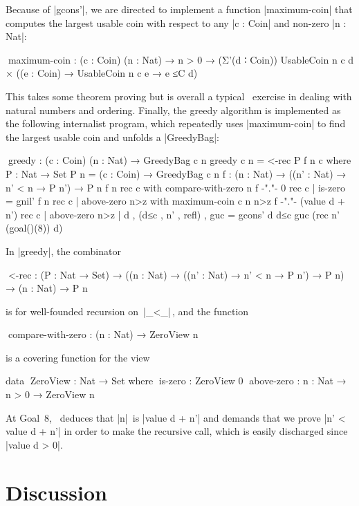 Because of |gcons'|, we are directed to implement a function |maximum-coin| that computes the largest usable coin with respect to any |c : Coin| and non-zero |n : Nat|:
\begin{code}
^^^maximum-coin :
  (c : Coin) (n : Nat) → n > 0 →
  (Σ'(d ∶ Coin))  UsableCoin n c d × ((e : Coin) → UsableCoin n c e → e ≤C d)
\end{code}
This takes some theorem proving but is overall a typical \Agda\ exercise in dealing with natural numbers and ordering.
Finally, the greedy algorithm is implemented as the following internalist program, which repeatedly uses |maximum-coin| to find the largest usable coin and unfolds a |GreedyBag|:
\begin{code}
^^^greedy : (c : Coin) (n : Nat) → GreedyBag c n
greedy c n = <-rec P f n c
  where
    P : Nat → Set
    P n = (c : Coin) → GreedyBag c n
    f : (n : Nat) → ((n' : Nat) → n' < n → P n') → P n
    f          n               rec  c  with compare-with-zero n 
    f {-"."-}  0               rec  c  | is-zero = gnil'
    f          n               rec  c  | above-zero n>z   with maximum-coin c n n>z
    f {-"."-}  (value d + n')  rec  c  | above-zero n>z   |  d , (d≤c , n' , refl) , guc =
                                                             gcons' d d≤c guc (rec n' (goal()(8)) d)
\end{code}
In |greedy|, the combinator
\begin{code}
^^^<-rec :  (P : Nat → Set) →
            ((n : Nat) → ((n' : Nat) → n' < n → P n') → P n) →
            (n : Nat) → P n
\end{code}
is for well-founded recursion on~|_<_|\,, and the function
\begin{code}
^^^compare-with-zero : (n : Nat) → ZeroView n
\end{code}
is a covering function for the view
\begin{code}
data ^^^ZeroView : Nat → Set where
  ^^^is-zero     :  ZeroView 0
  ^^^above-zero  :  {n : Nat} → n > 0 → ZeroView n
\end{code}
At Goal~8, \Agda\ deduces that |n|~is |value d + n'| and demands that we prove |n' < value d + n'| in order to make the recursive call, which is easily discharged since |value d > 0|.

\section{Discussion}
\label{sec:algebraic-discussion}

